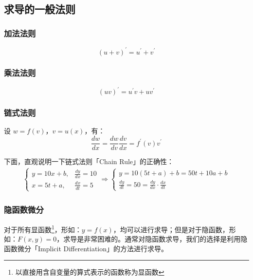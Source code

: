 \documentclass{ctexart}
\numberwithin{equation}{section}
\numberwithin{figure}{section}
\begin{document}
\subsection{求导的一般法则}

\subsubsection{加法法则}
\begin{equation}
    (u + v)^{\prime} = u^{\prime} + v^{\prime}
\end{equation}

\subsubsection{乘法法则}
\begin{equation}
    (uv)^{\prime} = u^{\prime}v + uv^{\prime}
\end{equation}

\subsubsection{链式法则}
设 \( w = f(v)\)，\(v = u(x) \)，有：
\begin{equation}
    \frac{dw}{dx} = \frac{dw}{dv} \frac{dv}{dx} = f^{\prime}(v)v^{\prime}
\end{equation}

下面，直观说明一下链式法则「Chain Rule」的正确性：
\begin{align*}
    \begin{cases}
        y = 10x + b, & \frac{dy}{dx} = 10 \\
        x = 5t + a,  & \frac{dx}{dt} = 5
    \end{cases}
    \Rightarrow
    \begin{cases}
        y = 10(5t + a) + b = 50t + 10a + b \\
        \frac{dy}{dt} = 50 = \frac{dy}{dx}\cdot \frac{dx}{dt}
    \end{cases}
\end{align*}

\subsubsection{隐函数微分}\label{sec:Implicit Differentiation}

对于所有显函数\footnote{以直接用含自变量的算式表示的函数称为显函数}，形如：\(y=f(x)\)，均可以进行求导；但是对于隐函数，形如：\(F(x,y) = 0\)，求导是非常困难的。通常对隐函数求导，我们的选择是利用隐函数微分「Implicit Differentiation」的方法进行求导。
\end{document}
